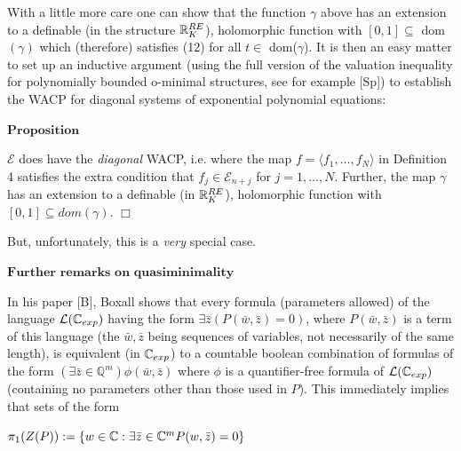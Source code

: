 \documentclass[12pt,nodate]{article}
\begin{document}
 \vspace{4mm}
 
 With a little more care one can show that the function $\gamma$ above has an extension to a definable (in the structure $\mathbb{R}_{K}^{RE}$), holomorphic function with $[0, 1] \subseteq$ dom$(\gamma )$ which (therefore) satisfies (12) for all $t \in$ dom($\gamma$). It is then an easy matter to set up an inductive argument (using the full version of the valuation inequality for polynomially bounded o-minimal structures, see for example [Sp]) to establish the WACP for diagonal systems of exponential polynomial equations:
 
 \vspace{2mm}
 
 \noindent
 $\mathbf{Proposition}$
 
 
 
 $\mathcal{E}$ does have the \emph{diagonal} WACP, i.e. where the map $f = \langle f_1 , \ldots , f_N \rangle$ in Definition 4 satisfies the extra condition that $f_j \in \mathcal{E}_{n+j}$ for $j = 1, \ldots , N$. Further, the map $\gamma$ has an extension to a definable (in $\mathbb{R}^{RE}_{K}$), holomorphic function with $[0, 1] \subseteq dom(\gamma)$. $\Box$
 
 \vspace{3mm}
 
 But, unfortunately, this is a \emph{very} special case.
 
 \vspace{5mm}
 
 \noindent
 $\mathbf{Further}$ $\mathbf{remarks}$ $\mathbf{on}$ $\mathbf{quasiminimality}$
 
 \vspace{2mm}
 
 In his paper [B], Boxall shows that every formula (parameters allowed) of the language $\mathcal{L}(\mathbb{C}_{exp})$  having the form $\exists \bar{z} ( P( \bar{w}, \bar{z} ) = 0)$, where $P(\bar{w}, \bar{z})$ is a term of this language (the $\bar{w},  \bar{z}$ being sequences of variables, not necessarily of the same length), is equivalent (in $\mathbb{C}_{exp}$) to a countable boolean combination of formulas of the form 
 $(\exists \bar{z} \in \mathbb{Q}^{m})  \phi(\bar{w}, \bar{z})$ where $\phi$ is a quantifier-free formula of $\mathcal{L}(\mathbb{C}_{exp})$ (containing no parameters other than those used in $P$). This immediately implies that sets of the form 
 
 \vspace{2mm}
 
 \hspace{16mm} $\pi_1(Z(P)) := \{ w \in \mathbb{C} : \exists \bar{z} \in \mathbb{C}^m  P( w, \bar{z}) = 0 \}$
 
\end{document}
